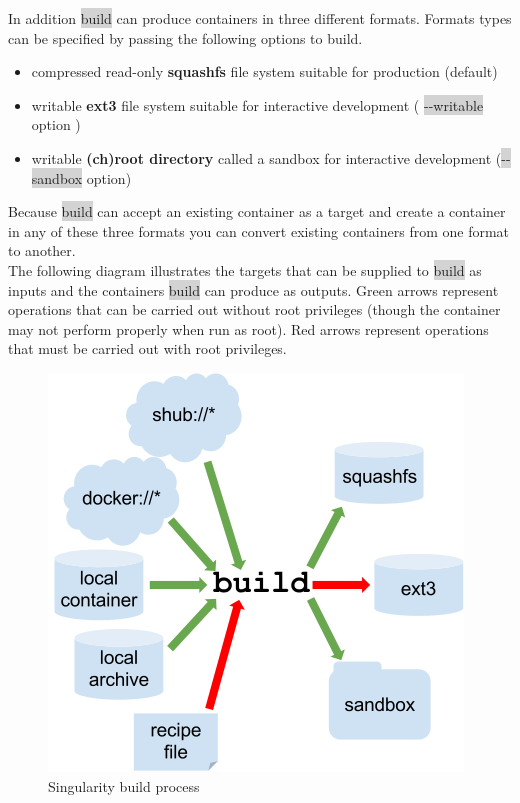 \documentclass[a4paper]{article}
\begin{document}
In addition \colorbox{lightgray}{build} can produce containers in three different formats. Formats types can be specified by passing the following options to build.
\\
\begin{itemize}
\item compressed read-only \textbf{squashfs} file system suitable for production (default)
\item writable \textbf{ext3} file system suitable for interactive development ( \colorbox{lightgray}{-{}-writable} option )
\item writable \textbf{(ch)root directory} called a sandbox for interactive development (\colorbox{lightgray}{-{}-sandbox} option)
\end{itemize}

Because \colorbox{lightgray}{build} can accept an existing container as a target and create a container in any of these three formats you can convert existing containers from one format to another.\\

The following diagram illustrates the targets that can be supplied to \colorbox{lightgray}{build} as inputs and the containers \colorbox{lightgray}{build} can produce as outputs. Green arrows represent operations that can be carried out without root privileges (though the container may not perform properly when run as root). Red arrows represent operations that must be carried out with root privileges.


\begin{figure}[h]
\centering
\hspace*{-0.62in}
\includegraphics{build_input_output.png}
\caption{Singularity build process}
\end{figure}
\end{document}
